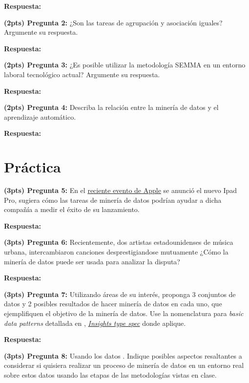 \documentclass[twoside,11pt]{article}
\newcommand\studentNumber{XXXXXXXX}          %
\newcommand{\customBlock}[1]{}
\begin{document}
\textbf{Respuesta: } {\color{ucvia}}
\vskip 0.3in


\textbf{(2pts) Pregunta 2:} ¿Son las tareas de agrupaci\'on y asociaci\'on iguales? Argumente su respuesta.

\textbf{Respuesta: } {\color{ucvia}}
\vskip 0.3in


\textbf{(2pts) Pregunta 3:} ¿Es posible utilizar la metodolog\'ia SEMMA en un entorno laboral tecnol\'ogico actual? Argumente su respuesta.

\textbf{Respuesta: } {\color{ucvia}}
\vskip 0.3in

\textbf{(2pts) Pregunta 4:} Describa la relación entre la minería de datos y el aprendizaje automático.

\textbf{Respuesta: } {\color{ucvia}}
\vskip 0.3in

\newpage
\section*{Práctica}
\label{sec:practice}

\textbf{(3pts) Pregunta 5:} En el \href{https://www.youtube.com/watch?v=f1J38FlDKxo}{reciente evento de Apple} se anunci\'o el nuevo Ipad Pro, sugiera c\'omo las tareas de miner\'ia de datos podr\'ian ayudar a dicha compa\~n\'ia a medir el \'exito de su lanzamiento.

\textbf{Respuesta: } {\color{ucvia}}
\vskip 0.3in

\textbf{(3pts) Pregunta 6:} Recientemente, dos artistas estadounidenses de m\'usica urbana, intercambiaron canciones desprestigiandose mutuamente ¿C\'omo la miner\'ia de datos puede ser usada para analizar la disputa?

\textbf{Respuesta: } {\color{ucvia}}
\vskip 0.3in

\textbf{(3pts) Pregunta 7:} Utilizando \'areas de su inter\'es, proponga 3 conjuntos de datos y 2 posibles resultados de hacer miner\'ia de datos en cada uno, que ejemplifiquen el objetivo de la miner\'ia de datos. Use la nomenclatura para \textsl{basic data patterns} detallada en \cite{Ma2021MetaInsightAD}, \href{https://www.microsoft.com/en-us/research/uploads/prod/2016/12/Insight-Types-Specification.pdf}{\textsl{Insights type spec}} donde aplique.

\textbf{Respuesta: } {\color{ucvia}}
\vskip 0.3in

\textbf{(3pts) Pregunta 8:} Usando los datos \customBlock{p2}.
Indique posibles aspectos resaltantes a considerar si quisiera realizar un proceso de minería de datos en un entorno real sobre estos datos usando las etapas de las metodologías vistas en clase.
\end{document}

